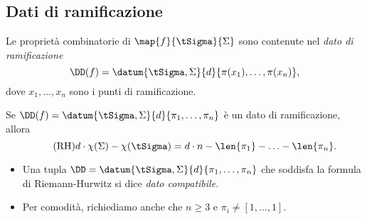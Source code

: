 \subsection{Dati di ramificazione}
\begin{frame}
Le proprietà combinatorie di $\map{f}{\tSigma}{\Sigma}$ sono contenute nel \emph{dato di ramificazione}
\[
\DD(f)=\datum{\tSigma,\Sigma}{d}{\pi(x_1),\ldots,\pi(x_n)},
\]
dove $x_1,\ldots,x_n$ sono i punti di ramificazione.\pause
\begin{mybox}[title=Formula di Riemann-Hurwitz]
Se $\DD(f)=\datum{\tSigma,\Sigma}{d}{\pi_1,\ldots,\pi_n}$ è un dato di ramificazione, allora
\begin{equation}\tag{RH}
d\cdot\chi(\Sigma)-\chi(\tSigma)=d\cdot n-\len{\pi_1}-\ldots-\len{\pi_n}.
\end{equation}
\end{mybox}\pause
\begin{itemize}
\item<+-> Una tupla $\DD=\datum{\tSigma,\Sigma}{d}{\pi_1,\ldots,\pi_n}$ che soddisfa la formula di Riemann-Hurwitz si dice \emph{dato compatibile}.
\item<+-> Per comodità, richiediamo anche che $n\ge 3$ e $\pi_i\neq[1,\ldots,1]$.
\end{itemize}
\end{frame}

